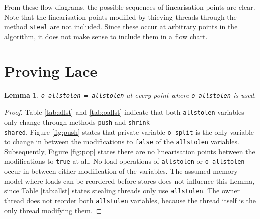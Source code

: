 \documentclass{sig-alternate-br}
\newtheorem{lemma}{Lemma}
\begin{document}
From these flow diagrams, the possible sequences of linearisation points are clear.
Note that the linearisation points modified by thieving threads through the method \texttt{steal} are not included.
Since these occur at arbitrary points in the algorithm, it does not make sense to include them in a flow chart.

\section{Proving Lace}
\begin{lemma}
	\texttt{o\_allstolen = allstolen} at every point where \texttt{o\_allstolen} is used.
	\label{lem:allstolen}
\end{lemma}
\begin{proof}
	Table \ref{tab:allst} and \ref{tab:oallst} indicate that both \texttt{allstolen} variables only change through methods \texttt{push} and \texttt{shrink\_\\shared}.
	Figure \ref{fig:push} states that private variable \texttt{o\_split} is the only variable to change in between the modifications to \texttt{false} of the \texttt{allstolen} variables.
	Subsequently, Figure \ref{fig:pop} states there are no linearisation points between the modifications to \texttt{true} at all.
	No load operations of \texttt{allstolen} or \texttt{o\_allstolen} occur in between either modification of the variables.
	The assumed memory model where loads can be reordered before stores does not influence this Lemma, since Table \ref{tab:allst} states stealing threads only use \texttt{allstolen}.
	The owner thread does not reorder both \texttt{allstolen} variables, because the thread itself is the only thread modifying them.
\end{proof}
\end{document}
